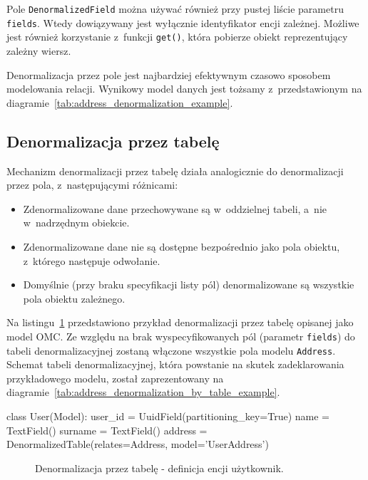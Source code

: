 Pole \verb+DenormalizedField+ można używać również przy pustej liście parametru \verb+fields+. Wtedy dowiązywany jest wyłącznie identyfikator encji zależnej. Możliwe jest również korzystanie z~funkcji \verb+get()+, która pobierze obiekt reprezentujący zależny wiersz.

Denormalizacja przez pole jest najbardziej efektywnym czasowo sposobem modelowania relacji. Wynikowy model danych jest tożsamy z~przedstawionym na diagramie~\ref{tab:address_denormalization_example}.

\subsection{Denormalizacja przez tabelę}

Mechanizm denormalizacji przez tabelę działa analogicznie do denormalizacji przez pola, z~następującymi różnicami:

\begin{itemize}
	\item Zdenormalizowane dane przechowywane są w~oddzielnej tabeli, a~nie w~nadrzędnym obiekcie. 
	\item Zdenormalizowane dane nie są dostępne bezpośrednio jako pola obiektu, z~którego następuje odwołanie. 
	\item Domyślnie (przy braku specyfikacji listy pól) denormalizowane są wszystkie pola obiektu zależnego.
\end{itemize}

Na listingu~\ref{lst:denormalization_by_table_example} przedstawiono przykład denormalizacji przez tabelę opisanej jako model OMC. Ze względu na brak wyspecyfikowanych pól (parametr \verb+fields+) do tabeli denormalizacyjnej zostaną włączone wszystkie pola modelu \verb+Address+. Schemat tabeli denormalizacyjnej, która powstanie na skutek zadeklarowania przykładowego modelu, został zaprezentowany na diagramie~\ref{tab:address_denormalization_by_table_example}.

\begin{verbbox}[\footnotesize]
class User(Model):
    user_id = UuidField(partitioning_key=True)
    name = TextField()
    surname = TextField()
    address = DenormalizedTable(relates=Address, model='UserAddress')
\end{verbbox}

\begin{figure}[ht!]
	\centering
	\theverbbox
	\caption{Denormalizacja przez tabelę - definicja encji użytkownik.}
	\label{lst:denormalization_by_table_example}
\end{figure}

